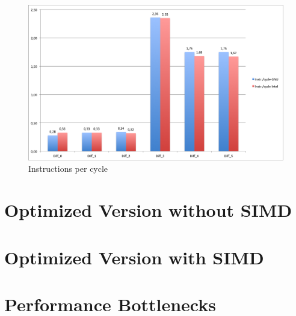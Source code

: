 \documentclass[12pt,a4paper]{article}
\begin{document}
\begin{figure}
	\centering
	\includegraphics[width=1.0\linewidth]{Benchmark/instrcycle}
	\caption{Instructions per cycle}
	\label{fig:instrcycle}
\end{figure}


\section{Optimized Version without SIMD}
\section{Optimized Version with SIMD}
\section{Performance Bottlenecks}
\end{document}
